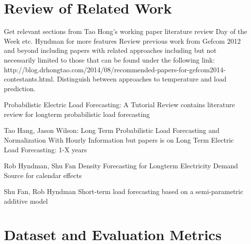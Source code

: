 \documentclass[conference]{IEEEtran}
\begin{document}

\section{Review of Related Work}
Get relevant sections from Tao Hong's working paper literature review
Day of the Week etc.
Hyndman for more features
Review previous work from Gefcom 2012 and beyond including papers with related approaches including but not necessarily limited to those that can be found under the following link: http://blog.drhongtao.com/2014/08/recommended-papers-for-gefcom2014-contestants.html. Distinguish between approaches to temperature and load prediction.\par
Probabilistic Electric Load Forecasting: A Tutorial Review
contains literature review for longterm probabilistic load forecasting

Tao Hang, Jason Wilson:
Long Term Probabilistic Load Forecasting and Normalization With Hourly Information
but papers is on Long Term Electric Load Forecasting: 1-X years \cite{Hong2014Normalization}

Rob Hyndman, Shu Fan
Density Forecasting for Longterm Electricity Demand
Source for calendar effects \cite{Hyndman2010}

Shu Fan, Rob Hyndman
Short-term load forecasting based on a semi-parametric additive model \cite{Fan2010}

\section{Dataset and Evaluation Metrics}
\end{document}
